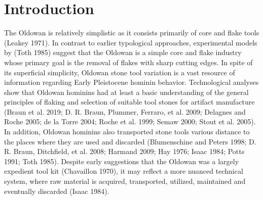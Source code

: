 \documentclass[]{elsarticle} %
\begin{document}
\doublespacing

\hypertarget{introduction}{%
\section{Introduction}\label{introduction}}

The Oldowan is relatively simplistic as it consists primarily of core
and flake tools (Leakey 1971). In contrast to earlier typological
approaches, experimental models by (Toth 1985) suggest that the Oldowan
is a simple core and flake industry whose primary goal is the removal of
flakes with sharp cutting edges. In spite of its superficial simplicity,
Oldowan stone tool variation is a vast resource of information regarding
Early Pleistocene hominin behavior. Technological analyses show that
Oldowan hominins had at least a basic understanding of the general
principles of flaking and selection of suitable tool stones for artifact
manufacture (Braun et al. 2019; D. R. Braun, Plummer, Ferraro, et al.
2009; Delagnes and Roche 2005; de la Torre 2004; Roche et al. 1999;
Semaw 2000; Stout et al. 2005). In addition, Oldowan hominins also
transported stone tools various distance to the places where they are
used and discarded (Blumenschine and Peters 1998; D. R. Braun,
Ditchfield, et al. 2008; Harmand 2009; Hay 1976; Isaac 1984; Potts 1991;
Toth 1985). Despite early suggestions that the Oldowan was a largely
expedient tool kit (Chavaillon 1970), it may reflect a more nuanced
technical system, where raw material is acquired, transported, utilized,
maintained and eventually discarded (Isaac 1984).
\end{document}
